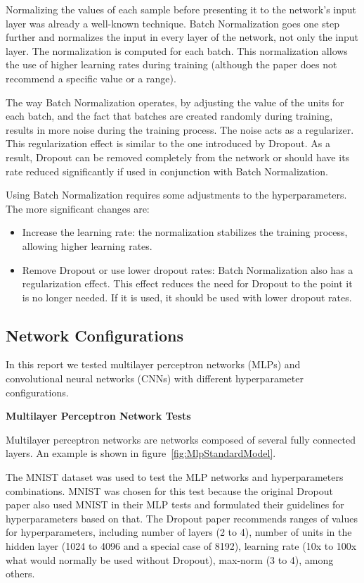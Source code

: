 \documentclass[../CAP6619_term_project_cgarbin.tex]{subfiles}
\begin{document}
Normalizing the values of each sample before presenting it to the network's input layer was already a well-known technique. Batch Normalization goes one step further and normalizes the input in every layer of the network, not only the input layer. The normalization is computed for each batch. This normalization allows the use of higher learning rates during training (although the paper does not recommend a specific value or a range).

The way Batch Normalization operates, by adjusting the value of the units for each batch, and the fact that batches are created randomly during training, results in more noise during the training process. The noise acts as a regularizer. This regularization effect is similar to the one introduced by Dropout. As a result, Dropout can be removed completely from the network or should have its rate reduced significantly if used in conjunction with Batch Normalization.

Using Batch Normalization requires some adjustments to the hyperparameters. The more significant changes are:

\begin{itemize}
\item Increase the learning rate: the normalization stabilizes the training process, allowing higher learning rates.
\item Remove Dropout or use lower dropout rates: Batch Normalization also has a regularization effect. This effect reduces the need for Dropout to the point it is no longer needed. If it is used, it should be used with lower dropout rates. 
\end{itemize}


\subsection{Network Configurations}

In this report we tested multilayer perceptron networks (MLPs) and convolutional neural networks (CNNs) with different hyperparameter configurations.

\medskip
\textbf{Multilayer Perceptron Network Tests}

Multilayer perceptron networks are networks composed of several fully connected layers.  An example is shown in figure~\ref{fig:MlpStandardModel}.

The MNIST dataset was used to test the MLP networks and hyperparameters combinations. MNIST was chosen for this test because the original Dropout paper \cite{Srivastava2014} also used MNIST in their MLP tests and formulated their guidelines for hyperparameters based on that. The Dropout paper recommends ranges of values for hyperparameters, including number of layers (2 to 4), number of units in the hidden layer (1024 to 4096 and a special case of 8192), learning rate (10x to 100x what would normally be used without Dropout), max-norm (3 to 4), among others.
\end{document}
